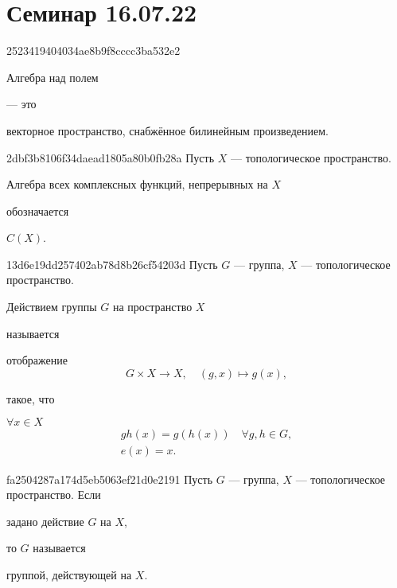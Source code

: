 


\section{Семинар 16.07.22}
\begin{note}{2523419404034ae8b9f8cccc3ba532e2}
    \begin{icloze}{2}Алгебра над полем\end{icloze} --- это \begin{icloze}{1}векторное пространство, снабжённое билинейным произведением.\end{icloze}
\end{note}

\begin{note}{2dbf3b8106f34daead1805a80b0fb28a}
    Пусть \({ X }\) --- топологическое пространство.
    \begin{icloze}{2}Алгебра всех комплексных функций, непрерывных на \({ X }\)\end{icloze} обозначается \begin{icloze}{2}\({ C(X) }\).\end{icloze}
\end{note}

\begin{note}{13d6e19dd257402ab78d8b26cf54203d}
    Пусть \({ G }\) --- группа, \({ X }\) --- топологическое пространство.
    \begin{icloze}{3}Действием группы \({ G }\) на пространство \({ X }\)\end{icloze} называется
    \begin{icloze}{1}
        отображение
        \[
            G \times X \to X, \quad (g, x) \mapsto g(x),
        \]
    \end{icloze}
    такое, что
    \begin{icloze}{2}
        \({ \forall x \in X }\)
        \[
            \begin{gathered}
                gh(x) = g(h(x)) \quad \forall g, h \in G, \\
                e(x) = x.
            \end{gathered}
        \]
    \end{icloze}
\end{note}

\begin{note}{fa2504287a174d5eb5063ef21d0e2191}
    Пусть \({ G }\) --- группа, \({ X }\) --- топологическое пространство.
    Если \begin{icloze}{2}задано действие \({ G }\) на \({ X }\),\end{icloze} то \({ G }\) называется \begin{icloze}{1}группой, действующей на \({ X }\).\end{icloze}
\end{note}

